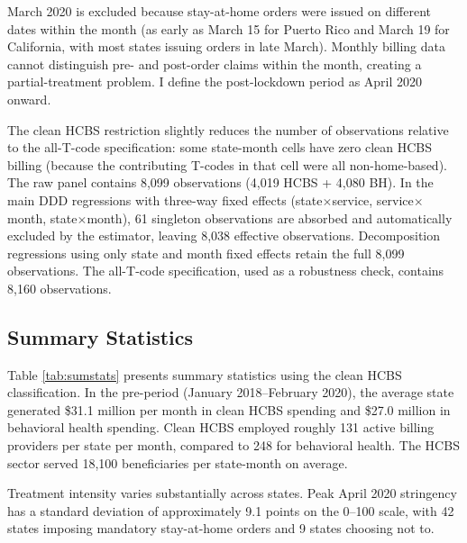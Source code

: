 \documentclass[12pt]{article}
\begin{document}
March 2020 is excluded because stay-at-home orders were issued on different dates within the month (as early as March 15 for Puerto Rico and March 19 for California, with most states issuing orders in late March). Monthly billing data cannot distinguish pre- and post-order claims within the month, creating a partial-treatment problem. I define the post-lockdown period as April 2020 onward.

The clean HCBS restriction slightly reduces the number of observations relative to the all-T-code specification: some state-month cells have zero clean HCBS billing (because the contributing T-codes in that cell were all non-home-based). The raw panel contains 8,099 observations (4,019 HCBS + 4,080 BH). In the main DDD regressions with three-way fixed effects (state$\times$service, service$\times$month, state$\times$month), 61 singleton observations are absorbed and automatically excluded by the estimator, leaving 8,038 effective observations. Decomposition regressions using only state and month fixed effects retain the full 8,099 observations. The all-T-code specification, used as a robustness check, contains 8,160 observations.

\subsection{Summary Statistics}



Table \ref{tab:sumstats} presents summary statistics using the clean HCBS classification. In the pre-period (January 2018--February 2020), the average state generated \$31.1 million per month in clean HCBS spending and \$27.0 million in behavioral health spending. Clean HCBS employed roughly 131 active billing providers per state per month, compared to 248 for behavioral health. The HCBS sector served 18,100 beneficiaries per state-month on average.

Treatment intensity varies substantially across states. Peak April 2020 stringency has a standard deviation of approximately 9.1 points on the 0--100 scale, with 42 states imposing mandatory stay-at-home orders and 9 states choosing not to.
\end{document}
